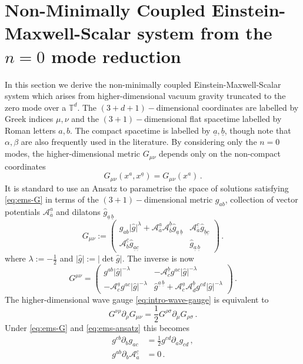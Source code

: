\documentclass[11pt, a4paper]{amsart}
\numberwithin{equation}{section}
\numberwithin{theorem}{section}
\newcommand{\p}{\partial}
\newcommand{\A}{\mathcal{A}}
\newcommand{\mn}{{\mu \nu}}
\newcommand{\tee}{{\mathbb{T}^d}}
\newcommand{\abar}{{\underline{a}}}
\newcommand{\bbar}{{\underline{b}}}
\newcommand{\cbar}{{\underline{c}}}
\newcommand{\abbar}{{\underline{a} \, \underline{b}}}
\begin{document}
\section{Non-Minimally Coupled Einstein-Maxwell-Scalar system from the $n=0$ mode reduction} \label{section:ems-full}
In this section we derive the non-minimally coupled Einstein-Maxwell-Scalar system which arises from higher-dimensional vacuum gravity truncated to the zero mode over a $\tee$. The $(3+d+1)-$dimensional coordinates are labelled by Greek indices $\mu, \nu$ and the $(3+1)-$dimensional flat spacetime labelled by Roman letters $a,b$. The compact spacetime is labelled by $\abar, \bbar$, though note that $\alpha, \beta$ are also frequently used in the literature. 
By considering only the $n=0$ modes, the higher-dimensional metric $G_\mn$ depends only on the non-compact coordinates
\begin{equation}
G_\mn(x^a, x^\abar) = G_\mn(x^a) \,. \label{eq:ems-G}
\end{equation}
It is standard to use an Ansatz to parametrise the space of solutions satisfying \eqref{eq:ems-G} in terms of the $(3+1)-$dimensional metric $g_{ab}$, collection of vector potentials $\A_a^\abar$ and dilatons $\hat{g}_\abbar$
\begin{equation}
G_\mn := \begin{pmatrix}
g_{ab} \vert \hat{g} \vert^\lambda + \A_a^\abar \A_b^\bbar \hat{g}_\abbar & \A^\cbar_a \hat{g}_{\bbar \cbar} \\
\A_b^\cbar \hat{g}_{\abar \cbar} & \hat{g}_\abbar
\end{pmatrix} \,.\label{eq:ems-ansatz}
\end{equation}
where $\lambda := - \frac{1}{2}$ and $\vert \hat{g} \vert :=\vert \det \hat{g} \vert$.  
The inverse is now
$$ G^\mn = \begin{pmatrix}
g^{ab} \vert \hat{g} \vert^{- \lambda} & - \A_c^\bbar g^{ac} \vert \hat{g} \vert^{- \lambda} \\
- \A_c^\abar g^{ac} \vert \hat{g} \vert^{- \lambda} & \hat{g}^\abbar + \A_c^\abar \A_d^\bbar g^{cd} \vert \hat{g} \vert^{- \lambda} 
\end{pmatrix} \,. $$
The higher-dimensional wave gauge \eqref{eq:intro-wave-gauge} is equivalent to
$$G^{\nu \rho} \p_\rho G_\mn = \frac{1}{2} G^{\rho \sigma} \p_\mu G_{\rho \sigma} \,. $$
 Under \eqref{eq:ems-G} and \eqref{eq:ems-ansatz} this becomes
\begin{subequations}
\begin{align}
g^{cb} \p_b g_{ac} &= \frac{1}{2} g^{cd} \p_a g_{cd} \,, \label{eq:ems-gauge1}\\  
g^{ab} \p_b \A^\cbar_a &= 0 \,. \label{eq:ems-gauge2}
 \end{align}
\end{subequations}
\end{document}
